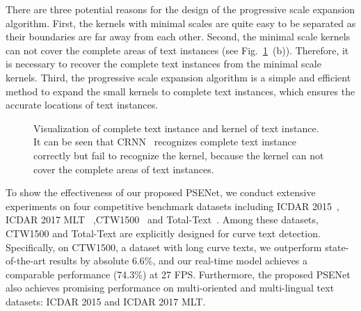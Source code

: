 \documentclass[10pt,twocolumn,letterpaper]{article}
\begin{document}
	There are three potential reasons for the design of the progressive scale expansion algorithm. First, the kernels with minimal scales are quite easy to be separated as their boundaries are far away from each other. Second, the minimal scale kernels can not cover the complete areas of text instances (see Fig.~\ref{fig:kernel_scale}~(b)). Therefore, it is necessary to recover the complete text instances from the minimal scale kernels. Third, the progressive scale expansion algorithm is a simple and efficient method to expand the small kernels to complete text instances, which ensures the accurate locations of text instances.
	
	\begin{figure}
		\centering
		\setlength{\fboxrule}{0pt}
		\caption{Visualization of complete text instance and kernel of text instance. It can be seen that CRNN~\cite{crnn} recognizes complete text instance correctly but fail to recognize the kernel, because the kernel can not cover the complete areas of text instances.}
		\label{fig:kernel_scale}
	\end{figure}	
	
	To show the effectiveness of our proposed PSENet, we conduct extensive experiments on four competitive benchmark datasets including ICDAR 2015~\cite{karatzas2015icdar}, ICDAR 2017 MLT~\cite{icdar2017mlt} ,CTW1500~\cite{Liu2017Detecting} and Total-Text~\cite{totaltext}. Among these datasets, CTW1500 and Total-Text are explicitly designed for curve text detection. 
	Specifically, on CTW1500, a dataset with long curve texts, we outperform state-of-the-art results by absolute 6.6\%, and our real-time model achieves a comparable performance (74.3\%) at 27 FPS. Furthermore, the proposed PSENet also achieves promising performance on multi-oriented and multi-lingual text datasets: ICDAR 2015 and ICDAR 2017 MLT.
	

	
\end{document}
